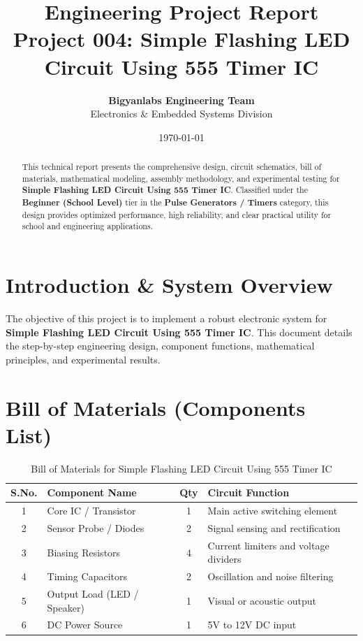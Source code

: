 \documentclass[11pt,a4paper]{article}
\title{\textbf{\Huge Engineering Project Report}\\[0.5em] \Large Project 004: Simple Flashing LED Circuit Using 555 Timer IC}
\author{\textbf{Bigyanlabs Engineering Team}\\ Electronics \& Embedded Systems Division}
\date{\today}
\begin{document}
\maketitle
\thispagestyle{empty}

\begin{abstract}
This technical report presents the comprehensive design, circuit schematics, bill of materials, mathematical modeling, assembly methodology, and experimental testing for \textbf{Simple Flashing LED Circuit Using 555 Timer IC}. Classified under the \textbf{Beginner (School Level)} tier in the \textbf{Pulse Generators / Timers} category, this design provides optimized performance, high reliability, and clear practical utility for school and engineering applications.
\end{abstract}

\newpage
\tableofcontents
\newpage

\section{Introduction \& System Overview}
The objective of this project is to implement a robust electronic system for \textbf{Simple Flashing LED Circuit Using 555 Timer IC}. This document details the step-by-step engineering design, component functions, mathematical principles, and experimental results.

\section{Bill of Materials (Components List)}
\begin{table}[h!]
\centering
\caption{Bill of Materials for Simple Flashing LED Circuit Using 555 Timer IC}
\vspace{0.5em}
\begin{tabular}{clcp{7cm}}
\toprule
\textbf{S.No.} & \textbf{Component Name} & \textbf{Qty} & \textbf{Circuit Function} \\
\midrule
1 & Core IC / Transistor & 1 & Main active switching element \\
2 & Sensor Probe / Diodes & 2 & Signal sensing and rectification \\
3 & Biasing Resistors & 4 & Current limiters and voltage dividers \\
4 & Timing Capacitors & 2 & Oscillation and noise filtering \\
5 & Output Load (LED / Speaker) & 1 & Visual or acoustic output \\
6 & DC Power Source & 1 & 5V to 12V DC input \\
\bottomrule
\end{tabular}
\end{table}
\end{document}
